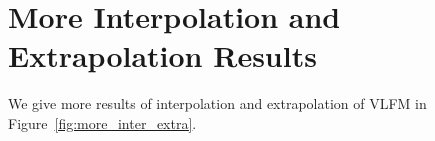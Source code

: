\section{More Interpolation and Extrapolation Results} \label{sec:app:more_2}

We give more results of interpolation and extrapolation of VLFM in Figure~\ref{fig:more_inter_extra}.

\begin{figure*}[!ht]
\begin{center}
\centering
     \\
     \\
\end{center}
\caption{Interpolation and Extrapolation of VLFM.}
\label{fig:more_inter_extra}
\end{figure*}